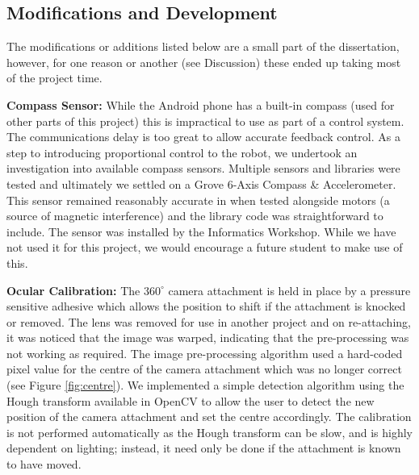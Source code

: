\documentclass[a4paper,11pt,twoside,openright]{article}
\begin{document}
\subsection{ Modifications and Development }\label{sec:mod}
The modifications or additions listed below are a small part of the dissertation,
however, for one reason or another (see Discussion) these ended up taking
most of the project time.\newline\par

\textbf{Compass Sensor:}
While the Android phone has a built-in compass (used for other parts of this
project) this is impractical to use as part of a control system. The
communications delay is too great to allow accurate feedback control.
As a step to introducing proportional control to the robot, we undertook an
investigation into available compass sensors. Multiple sensors and libraries
were tested and ultimately we settled on a Grove 6-Axis Compass \& Accelerometer.
This sensor remained reasonably accurate in when tested alongside motors (a
source of magnetic interference) and the library code was straightforward to
include. The sensor was installed by the Informatics Workshop. While we have not
used it for this project, we would encourage a future student to make use of
this.
\newline
\par

\textbf{Ocular Calibration:}
The $360^{\circ}$ camera attachment is held in place by a pressure sensitive
adhesive which allows the position to shift if the attachment is knocked or
removed. The lens was removed for use in another project and on re-attaching, it
was noticed that the image was warped, indicating that the pre-processing was not
working as required. The image pre-processing algorithm used a hard-coded pixel
value for the centre of the camera attachment which was no longer correct
(see Figure \ref{fig:centre}). We implemented a simple detection
algorithm using the Hough transform available in OpenCV to allow the user
to detect the new position of the camera attachment and set the centre
accordingly. The calibration is not performed automatically as the Hough
transform can be slow, and is highly dependent on lighting; instead, it
need only be done if the attachment is known to have moved.
\newline
\par
\end{document}
